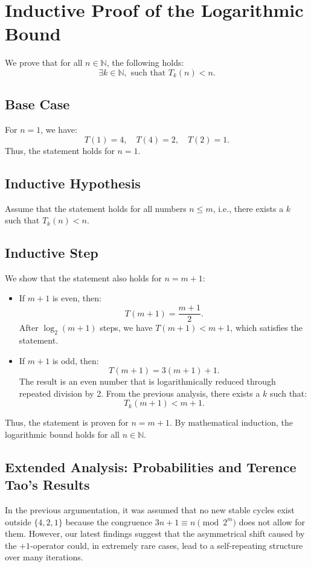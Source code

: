 \documentclass[a4paper,12pt]{article}
\begin{document}
\section{Inductive Proof of the Logarithmic Bound}
We prove that for all \( n \in \mathbb{N} \), the following holds:
\[
\exists k \in \mathbb{N}, \text{ such that } T_k(n) < n.
\]

\subsection{Base Case}
For \( n = 1 \), we have:
\[
T(1) = 4, \quad T(4) = 2, \quad T(2) = 1.
\]
Thus, the statement holds for \( n = 1 \).

\subsection{Inductive Hypothesis}
Assume that the statement holds for all numbers \( n \leq m \), i.e., there exists a \( k \) such that \( T_k(n) < n \).

\subsection{Inductive Step}
We show that the statement also holds for \( n = m + 1 \):
\begin{itemize}
    \item If \( m + 1 \) is even, then:
    \[
    T(m + 1) = \frac{m + 1}{2}.
    \]
    After \( \log_2(m + 1) \) steps, we have \( T(m + 1) < m + 1 \), which satisfies the statement.
    \item If \( m + 1 \) is odd, then:
    \[
    T(m + 1) = 3(m + 1) + 1.
    \]
    The result is an even number that is logarithmically reduced through repeated division by 2. From the previous analysis, there exists a \( k \) such that:
    \[
    T_k(m + 1) < m + 1.
    \]
\end{itemize}

Thus, the statement is proven for \( n = m + 1 \). By mathematical induction, the logarithmic bound holds for all \( n \in \mathbb{N} \).

\subsection{Extended Analysis: Probabilities and Terence Tao’s Results}

In the previous argumentation, it was assumed that no new stable cycles exist outside \( \{4,2,1\} \) because the congruence \( 3n + 1 \equiv n \pmod{2^m} \) does not allow for them. However, our latest findings suggest that the asymmetrical shift caused by the \(+1\)-operator could, in extremely rare cases, lead to a self-repeating structure over many iterations.
\end{document}
